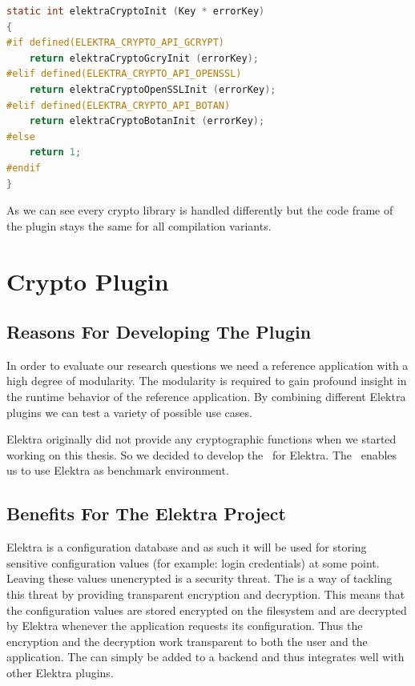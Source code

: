 \begin{lstlisting}[label=impl-cryptoInit,language=C,caption={Example of how to use compilation variants in Elektra}]
static int elektraCryptoInit (Key * errorKey)
{
#if defined(ELEKTRA_CRYPTO_API_GCRYPT)
	return elektraCryptoGcryInit (errorKey);
#elif defined(ELEKTRA_CRYPTO_API_OPENSSL)
	return elektraCryptoOpenSSLInit (errorKey);
#elif defined(ELEKTRA_CRYPTO_API_BOTAN)
	return elektraCryptoBotanInit (errorKey);
#else
	return 1;
#endif
}
\end{lstlisting}

As we can see every crypto library is handled differently but the code frame of the plugin stays the same for all compilation variants.

\section{Crypto Plugin}\label{crypto-plugin}

\subsection{Reasons For Developing The Plugin}

In order to evaluate our research questions we need a reference application with a high degree of modularity.
The modularity is required to gain profound insight in the runtime behavior of the reference application.
By combining different Elektra plugins we can test a variety of possible use cases.

Elektra originally did not provide any cryptographic functions when we started working on this thesis.
So we decided to develop the \crypto ~for Elektra.
The \crypto ~enables us to use Elektra as benchmark environment.

\subsection{Benefits For The Elektra Project}

Elektra is a configuration database and as such it will be used for storing sensitive configuration values (for example: login credentials) at some point.
Leaving these values unencrypted is a security threat.
The \crypto{} is a way of tackling this threat by providing transparent encryption and decryption.
This means that the configuration values are stored encrypted on the filesystem and are decrypted by Elektra whenever the application requests its configuration.
Thus the encryption and the decryption work transparent to both the user and the application.
The \crypto{} can simply be added to a backend and thus integrates well with other Elektra plugins.

